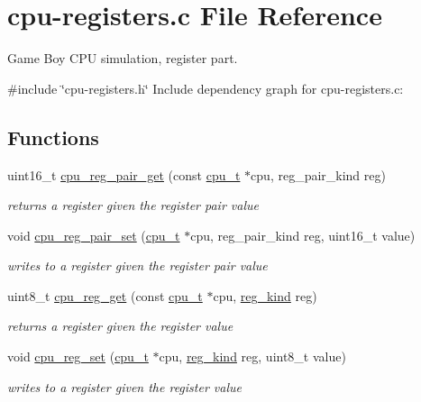 \hypertarget{cpu-registers_8c}{}\section{cpu-\/registers.c File Reference}
\label{cpu-registers_8c}


Game Boy C\+PU simulation, register part.  


{\ttfamily \#include \char`\"{}cpu-\/registers.\+h\char`\"{}}\newline
Include dependency graph for cpu-\/registers.c\+:
\subsection*{Functions}
\begin{DoxyCompactItemize}
\item 
uint16\+\_\+t \hyperlink{cpu-registers_8c_a259712cddf80a16395900832af372953}{cpu\+\_\+reg\+\_\+pair\+\_\+get} (const \hyperlink{structcpu__t}{cpu\+\_\+t} $\ast$cpu, reg\+\_\+pair\+\_\+kind reg)
\begin{DoxyCompactList}\small\item\em returns a register given the register pair value \end{DoxyCompactList}\item 
void \hyperlink{cpu-registers_8c_aa7482c91cfc29f6a4a1ba62127f6ea35}{cpu\+\_\+reg\+\_\+pair\+\_\+set} (\hyperlink{structcpu__t}{cpu\+\_\+t} $\ast$cpu, reg\+\_\+pair\+\_\+kind reg, uint16\+\_\+t value)
\begin{DoxyCompactList}\small\item\em writes to a register given the register pair value \end{DoxyCompactList}\item 
uint8\+\_\+t \hyperlink{cpu-registers_8c_abe62e977d253f7a6be79d0b5ca8f105f}{cpu\+\_\+reg\+\_\+get} (const \hyperlink{structcpu__t}{cpu\+\_\+t} $\ast$cpu, \hyperlink{cpu-registers_8h_ae7a73a08aaa7af3cfe957f32ef8af9d3}{reg\+\_\+kind} reg)
\begin{DoxyCompactList}\small\item\em returns a register given the register value \end{DoxyCompactList}\item 
void \hyperlink{cpu-registers_8c_a422598e03e342ec1c700cd61a3bc69b6}{cpu\+\_\+reg\+\_\+set} (\hyperlink{structcpu__t}{cpu\+\_\+t} $\ast$cpu, \hyperlink{cpu-registers_8h_ae7a73a08aaa7af3cfe957f32ef8af9d3}{reg\+\_\+kind} reg, uint8\+\_\+t value)
\begin{DoxyCompactList}\small\item\em writes to a register given the register value \end{DoxyCompactList}\end{DoxyCompactItemize}


